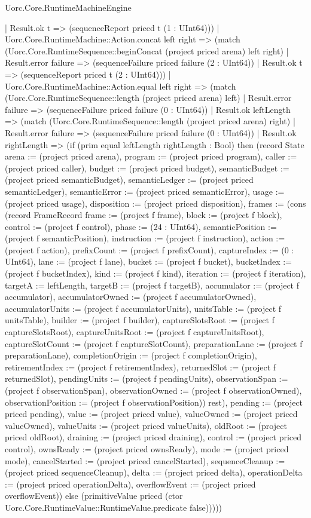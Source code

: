 \begin{lexlean}{Uorc.Core.RuntimeMachineEngine}
\begin{semanticmodule}
{                | Result.ok t => (sequenceReport priced t (1 : UInt64)))
              | Uorc.Core.RuntimeMachine::Action.concat left right => (match (Uorc.Core.RuntimeSequence::beginConcat (project priced arena) left right)
                | Result.error failure => (sequenceFailure priced failure (2 : UInt64))
                | Result.ok t => (sequenceReport priced t (2 : UInt64)))
              | Uorc.Core.RuntimeMachine::Action.equal left right => (match (Uorc.Core.RuntimeSequence::length (project priced arena) left)
                | Result.error failure => (sequenceFailure priced failure (0 : UInt64))
                | Result.ok leftLength => (match (Uorc.Core.RuntimeSequence::length (project priced arena) right)
                  | Result.error failure => (sequenceFailure priced failure (0 : UInt64))
                  | Result.ok rightLength => (if (prim equal leftLength rightLength : Bool) then (record State {arena := (project priced arena), program := (project priced program), caller := (project priced caller), budget := (project priced budget), semanticBudget := (project priced semanticBudget), semanticLedger := (project priced semanticLedger), semanticError := (project priced semanticError), usage := (project priced usage), disposition := (project priced disposition), frames := (cons (record FrameRecord {frame := (project f frame), block := (project f block), control := (project f control), phase := (24 : UInt64), semanticPosition := (project f semanticPosition), instruction := (project f instruction), action := (project f action), prefixCount := (project f prefixCount), captureIndex := (0 : UInt64), lane := (project f lane), bucket := (project f bucket), bucketIndex := (project f bucketIndex), kind := (project f kind), iteration := (project f iteration), targetA := leftLength, targetB := (project f targetB), accumulator := (project f accumulator), accumulatorOwned := (project f accumulatorOwned), accumulatorUnits := (project f accumulatorUnits), unitsTable := (project f unitsTable), builder := (project f builder), captureSlotsRoot := (project f captureSlotsRoot), captureUnitsRoot := (project f captureUnitsRoot), captureSlotCount := (project f captureSlotCount), preparationLane := (project f preparationLane), completionOrigin := (project f completionOrigin), retirementIndex := (project f retirementIndex), returnedSlot := (project f returnedSlot), pendingUnits := (project f pendingUnits), observationSpan := (project f observationSpan), observationOwned := (project f observationOwned), observationPosition := (project f observationPosition)}) rest), pending := (project priced pending), value := (project priced value), valueOwned := (project priced valueOwned), valueUnits := (project priced valueUnits), oldRoot := (project priced oldRoot), draining := (project priced draining), control := (project priced control), ownsReady := (project priced ownsReady), mode := (project priced mode), cancelStarted := (project priced cancelStarted), sequenceCleanup := (project priced sequenceCleanup), delta := (project priced delta), operationDelta := (project priced operationDelta), overflowEvent := (project priced overflowEvent)}) else (primitiveValue priced (ctor Uorc.Core.RuntimeValue::RuntimeValue.predicate false)))))
}
\end{semanticmodule}
\end{lexlean}
